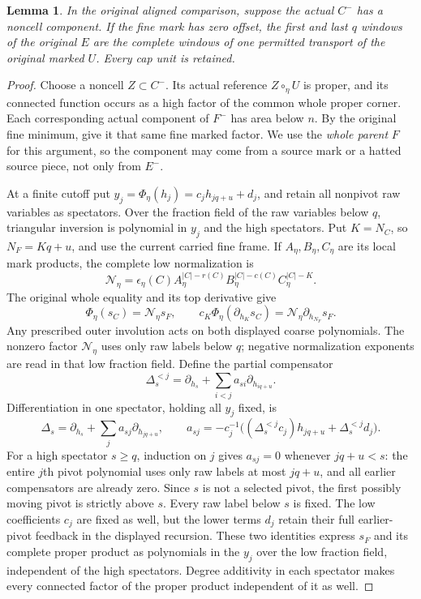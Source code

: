 \documentclass[11pt,a4paper]{amsart}
\numberwithin{equation}{section}
\theoremstyle{plain}
\newtheorem{lemma}[theorem]{Lemma}
\theoremstyle{definition}
\begin{document}
\begin{lemma}\label{lem:conormal-caps}
In the original aligned comparison, suppose the actual \(C^-\) has a
noncell component.  If the fine mark has zero offset, the first and last
\(q\) windows of the original \(E\) are the complete windows of one permitted
transport of the original marked \(U\).  Every cap unit is retained.
\end{lemma}
\begin{proof}
Choose a noncell \(Z\subset C^-\).  Its actual reference
\(Z\circ_\eta U\) is proper, and its connected function occurs as a high
factor of the common whole proper corner.  Each corresponding actual
component of \(F^-\) has area below \(n\).  By the original fine minimum,
 give it that same fine marked factor.
We use the \emph{whole parent} \(F\) for this argument, so the component may
come from a source mark or a hatted source piece, not only from \(E^-\).

At a finite cutoff put
\(y_j=\Phi_\eta(h_j)=c_jh_{jq+u}+d_j\), and retain all nonpivot raw variables
as spectators.  Over the fraction field of the raw variables below \(q\),
triangular inversion is polynomial in \(y_j\) and the high spectators.
Put \(K=N_C\), so \(N_F=Kq+u\), and use the current carried fine
frame.  If \(A_\eta,B_\eta,C_\eta\) are its local mark products, the
complete low normalization is
\[
 \mathcal N_\eta=\epsilon_\eta(C)
 A_\eta^{|C|-r(C)}B_\eta^{|C|-c(C)}C_\eta^{|C|-K}.
\]
The original whole equality and its top derivative give
\[
 \Phi_\eta(s_C)=\mathcal N_\eta s_F,\qquad
 c_K\Phi_\eta(\partial_{h_K}s_C)
    =\mathcal N_\eta\partial_{h_{N_F}}s_F.
\]
Any prescribed outer involution acts on both displayed coarse
polynomials.  The nonzero factor \(\mathcal N_\eta\) uses only raw
labels below \(q\); negative normalization exponents are read in that
low fraction field.
Define the partial compensator
\[
 \Delta_s^{<j}=\partial_{h_s}
       +\sum_{i<j}a_{si}\partial_{h_{iq+u}}.
\]
Differentiation in one spectator, holding all \(y_j\) fixed, is
\[
 \Delta_s=\partial_{h_s}+\sum_j a_{sj}\partial_{h_{jq+u}},\qquad
 a_{sj}=-c_j^{-1}\bigl((\Delta_s^{<j}c_j)h_{jq+u}
                              +\Delta_s^{<j}d_j\bigr).
\]
For a high spectator \(s\ge q\), induction on \(j\) gives \(a_{sj}=0\)
whenever \(jq+u<s\): the entire \(j\)th pivot polynomial uses only raw
labels at most \(jq+u\), and all earlier compensators are already zero.
Since \(s\) is not a selected pivot, the first possibly moving pivot is
strictly above \(s\).  Every raw label below \(s\) is fixed.  The low
coefficients \(c_j\) are fixed as well, but the lower terms \(d_j\) retain
their full earlier-pivot feedback in the displayed recursion.
These two identities express \(s_F\) and its complete proper product
as polynomials in the \(y_j\) over the low fraction field, independent
of the high spectators.  Degree additivity in each spectator makes
every connected factor of the proper product independent of it as well.


\end{proof}
\end{document}
